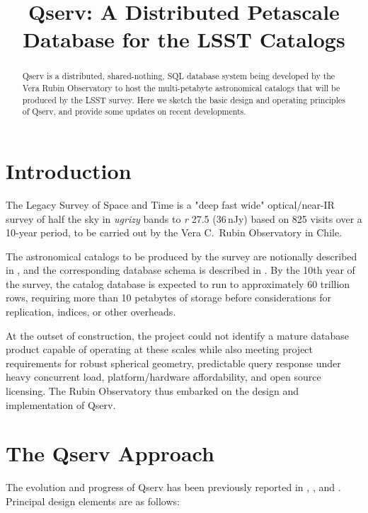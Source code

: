 \documentclass[11pt,twoside]{article}
\begin{document}

\title{Qserv: A Distributed Petascale Database for the LSST Catalogs}



\begin{abstract}
Qserv is a distributed, shared-nothing, SQL database system being developed by the Vera Rubin Observatory to
host the multi-petabyte astronomical catalogs that will be produced by the LSST survey.  Here we sketch the
basic design and operating principles of Qserv, and provide some updates on recent developments.
\end{abstract}

\section{Introduction}

The Legacy Survey of Space and Time \citep{2019ApJ...873..111I} is a "deep fast wide" optical/near-IR survey
of half the sky in \emph{ugrizy} bands to \emph{r} 27.5 (36\,nJy) based on 825 visits over a 10-year period,
to be carried out by the Vera C.\ Rubin Observatory in Chile.

The astronomical catalogs to be produced by the survey are notionally described in \citet{LSE-163}, and the
corresponding database schema is described in \citet{LDM-153}.  By the 10th year of the survey, the catalog
database is expected to run to approximately 60 trillion rows, requiring more than 10 petabytes of storage
before considerations for replication, indices, or other overheads.

At the outset of construction, the project could not identify a mature database product capable of operating
at these scales while also meeting project requirements for robust spherical geometry, predictable query
response under heavy concurrent load, platform/hardware affordability, and open source licensing.  The Rubin
Observatory thus embarked on the design and implementation of Qserv.

\section{The Qserv Approach}

The evolution and progress of Qserv has been previously reported in \citet{2006SPIE.6270E..0RB},
\citet{2011Wang:2011:QDS:2063348.2063364}, and \citet{LDM-135}.  Principal design elements are as follows:
\end{document}
